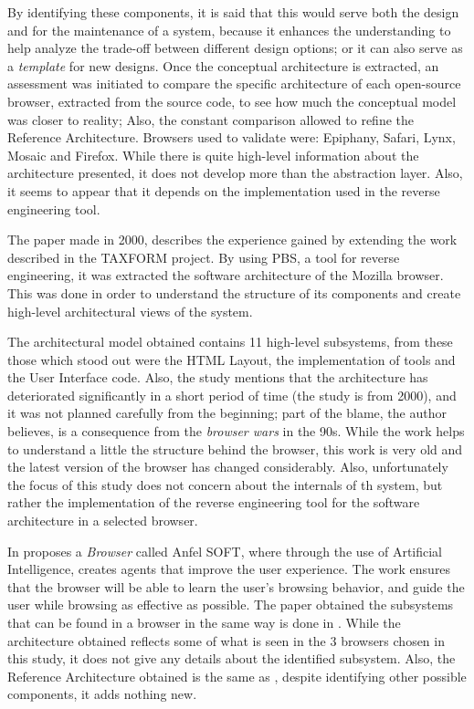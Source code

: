 \documentclass{sig-alternate-05-2015}
\begin{document}
  By identifying these components, it is said that this would serve both the design and for the maintenance of a system, because it enhances the understanding to help analyze the trade-off between different design options; or it can also serve as a \textit{template} for new designs. Once the conceptual architecture is extracted, an assessment was initiated to compare the specific architecture of each open-source browser, extracted from the source code, to see how much the conceptual model was closer to reality; Also, the constant comparison allowed to refine the Reference Architecture. Browsers used to validate were: Epiphany, Safari, Lynx, Mosaic and Firefox. While there is quite high-level information about the architecture presented, it does not develop more than the abstraction layer. Also, it seems to appear that it depends on the implementation used in the reverse engineering tool.  

  The paper \cite{Godfrey2000} made in 2000, describes the experience gained by extending the work described in the TAXFORM project. By using PBS, a tool for reverse engineering, it was extracted the software architecture of the Mozilla browser. This was done in order to understand the structure of its components and create high-level architectural views of the system. 

  The architectural model obtained contains 11 high-level subsystems, from these those which stood out were the HTML Layout, the implementation of tools and the User Interface code. Also, the study mentions that the architecture has deteriorated significantly in a short period of time (the study is from 2000), and it was not planned carefully from the beginning; part of the blame, the author believes, is a consequence from the \textit{browser wars} in the 90s. While the work helps to understand a little the structure behind the browser, this work is very old and the latest version of the browser has changed considerably. Also, unfortunately the focus of this study does not concern about the internals of th system, but rather the implementation of the reverse engineering tool for the software architecture in a selected browser.

  In \cite{Lwin2009} proposes a \textit{Browser} called Anfel SOFT, where through the use of Artificial Intelligence, creates agents that improve the user experience. The work ensures that the browser will be able to learn the user's browsing behavior, and guide the user while browsing as effective as possible. The paper obtained the subsystems that can be found in a browser in the same way is done in \cite{2005-grosskurth-browser-refarch}. While the architecture obtained reflects some of what is seen in the 3 browsers chosen in this study, it does not give any details about the identified subsystem. Also, the Reference Architecture obtained is the same as \cite{2005-grosskurth-browser-refarch,preprint-Grosskurth-browser-archevol}, despite identifying other possible components, it adds nothing new.
\end{document}
